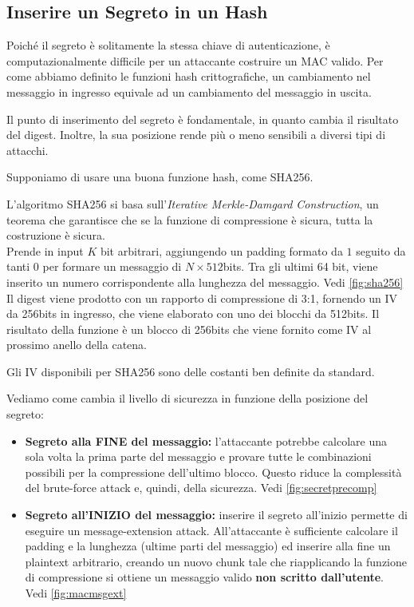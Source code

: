 \subsection{Inserire un Segreto in un Hash}\label{sub:secretpos}
Poiché il segreto è solitamente la stessa chiave di autenticazione, è computazionalmente difficile per un attaccante costruire un MAC valido. Per come abbiamo definito le funzioni hash crittografiche, un cambiamento nel messaggio in ingresso equivale ad un cambiamento del messaggio in uscita.
\begin{remark}
Il punto di inserimento del segreto è fondamentale, in quanto cambia il risultato del digest. Inoltre, la sua posizione rende più o meno sensibili a diversi tipi di attacchi.
\end{remark}
Supponiamo di usare una buona funzione hash, come SHA256.
\begin{definition}[SHA256]
L'algoritmo SHA256 si basa sull'\textit{Iterative Merkle-Damgard Construction}, un teorema che garantisce che se la funzione di compressione è sicura, tutta la costruzione è sicura.\\
Prende in input $K$ bit arbitrari, aggiungendo un padding formato da $1$ seguito da tanti $0$ per formare un messaggio di $N\times512$bits. Tra gli ultimi 64 bit, viene inserito un numero corrispondente alla lunghezza del messaggio. Vedi \cref{fig:sha256}\\
Il digest viene prodotto con un rapporto di compressione di 3:1, fornendo un IV da 256bits in ingresso, che viene elaborato con uno dei blocchi da 512bits. Il risultato della funzione è un blocco di 256bits che viene fornito come IV al prossimo anello della catena.
\end{definition}
\begin{note}Gli IV disponibili per SHA256 sono delle costanti ben definite da standard.\end{note}
Vediamo come cambia il livello di sicurezza in funzione della posizione del segreto:
\begin{itemize}
    \item \textbf{Segreto alla FINE del messaggio:} l'attaccante potrebbe calcolare una sola volta la prima parte del messaggio e provare tutte le combinazioni possibili per la compressione dell'ultimo blocco. Questo riduce la complessità del brute-force attack e, quindi, della sicurezza. Vedi \cref{fig:secretprecomp}
    \item \textbf{Segreto all'INIZIO del messaggio:} inserire il segreto all'inizio permette di eseguire un message-extension attack. All'attaccante è sufficiente calcolare il padding e la lunghezza (ultime parti del messaggio) ed inserire alla fine un plaintext arbitrario, creando un nuovo chunk tale che riapplicando la funzione di compressione si ottiene un messaggio valido \textbf{non scritto dall'utente}. Vedi \cref{fig:macmsgext}
\end{itemize}
